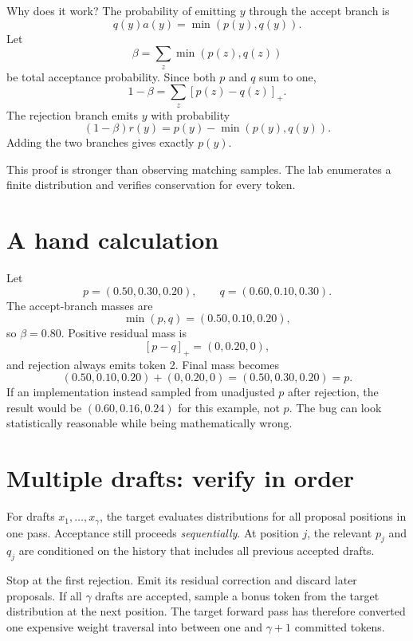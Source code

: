 Why does it work? The probability of emitting $y$ through the accept branch is
\[
q(y)a(y)=\min(p(y),q(y)).
\]
Let
\[
\beta=\sum_z\min(p(z),q(z))
\]
be total acceptance probability. Since both $p$ and $q$ sum to one,
\[
1-\beta=\sum_z[p(z)-q(z)]_+.
\]
The rejection branch emits $y$ with probability
\[
(1-\beta)r(y)=p(y)-\min(p(y),q(y)).
\]
Adding the two branches gives exactly $p(y)$.

This proof is stronger than observing matching samples. The lab enumerates a finite
distribution and verifies conservation for every token.

\section{A hand calculation}

Let
\[
p=(0.50,0.30,0.20),\qquad q=(0.60,0.10,0.30).
\]
The accept-branch masses are
\[
\min(p,q)=(0.50,0.10,0.20),
\]
so $\beta=0.80$. Positive residual mass is
\[
[p-q]_+=(0,0.20,0),
\]
and rejection always emits token 2. Final mass becomes
\[
(0.50,0.10,0.20)+(0,0.20,0)=(0.50,0.30,0.20)=p.
\]
If an implementation instead sampled from unadjusted $p$ after rejection, the result
would be $(0.60,0.16,0.24)$ for this example, not $p$. The bug can look statistically
reasonable while being mathematically wrong.

\section{Multiple drafts: verify in order}

For drafts $x_1,\ldots,x_\gamma$, the target evaluates distributions for all proposal
positions in one pass. Acceptance still proceeds \emph{sequentially}. At position
$j$, the relevant $p_j$ and $q_j$ are conditioned on the history that includes all
previous accepted drafts.

Stop at the first rejection. Emit its residual correction and discard later proposals.
If all $\gamma$ drafts are accepted, sample a bonus token from the target distribution
at the next position. The target forward pass has therefore converted one expensive
weight traversal into between one and $\gamma+1$ committed tokens.


